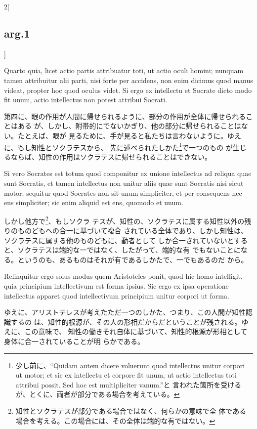\documentclass[paper=a4paper,fontsize=10pt,jafontsize=9pt,titlepage]{jlreq}
\begin{document}
\begin{paracol}{2}[\subsection{arg.1}]
\switchcolumn*

 Quarto quia, licet actio partis attribuatur toti, ut actio oculi homini;
 nunquam tamen attribuitur alii parti, nisi forte per accidens, non enim dicimus
 quod manus videat, propter hoc quod oculus videt. Si ergo ex intellectu et
 Socrate dicto modo fit unum, actio intellectus non potest attribui Socrati.
 
\switchcolumn

第四に、眼の作用が人間に帰せられるように、部分の作用が全体に帰せられることはある
が、しかし、附帯的にでないかぎり、他の部分に帰せられることはない。たとえば、眼が
見るために、手が見ると私たちは言わないように。ゆえに、もし知性とソクラテスから、
先に述べられたしかた\footnote{少し前に、``Quidam autem dicere voluerunt quod
intellectus unitur corpori ut motor; et sic ex intellectu et corpore fit unum,
ut actio intellectus toti attribui possit. Sed hoc est multipliciter vanum.''と
言われた箇所を受けるが、とくに、両者が部分である場合を考えている。}で一つのもの
が生じるならば、知性の作用はソクラテスに帰せられることはできない。
 
\switchcolumn*


Si vero Socrates est totum quod componitur ex unione intellectus ad reliqua quae
 sunt Socratis, et tamen intellectus non unitur aliis quae sunt Socratis nisi
 sicut motor; sequitur quod Socrates non sit unum simpliciter, et per consequens
 nec ens simpliciter; sic enim aliquid est ens, quomodo et unum.

 \switchcolumn

 しかし他方で\footnote{知性とソクラテスが部分である場合ではなく、何らかの意味で全
   体である場合を考える。この場合には、その全体は端的な有ではない。}、もしソクラ
 テスが、知性の、ソクラテスに属する知性以外の残りのものどもへの合一に基づいて複合
 されている全体であり、しかし知性は、ソクラテスに属する他のものどもに、動者として
 しか合一されていないとすると、ソクラテスは端的な一ではなく、したがって、端的な有
 でもないことになる。というのも、あるものはそれが有であるしかたで、一でもあるのだ
 から。

\switchcolumn*
 
 Relinquitur ergo solus modus quem Aristoteles ponit, quod hic homo intelligit,
 quia principium intellectivum est forma ipsius. Sic ergo ex ipsa operatione
 intellectus apparet quod intellectivum principium unitur corpori ut forma.

 \switchcolumn 

ゆえに、アリストテレスが考えたただ一つのしかた、つまり、この人間が知性認識するの
は、知性的根源が、その人の形相だからだということが残される。ゆえに、この意味で、
知性の働きそれ自体に基づいて、知性的根源が形相として身体に合一されていることが明
らかである。
 

\end{paracol}
\end{document}
